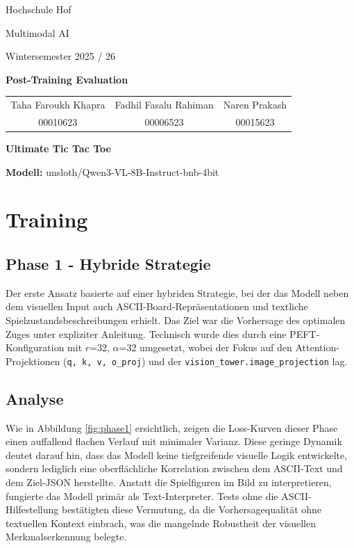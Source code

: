 \documentclass[12pt,a4paper]{article}
\begin{document}
	\begin{titlepage}
		\centering
		
		{\large Hochschule Hof}
		\vspace{0.5cm}
		
		{\large Multimodal AI}
		\vspace{0.5cm}
		
		{\large Wintersemester 2025 / 26}
		\vfill
		
		\vspace{0.5cm}
		{\huge\bfseries Post-Training Evaluation}
		\vspace{1cm}
		
		\begin{tabular}{c c c}
			\large Taha Faroukh Khapra & \large Fadhil Fasalu Rahiman & \large Naren Prakash \\
			\small 00010623 & \small 00006523 & \small 00015623
		\end{tabular}
		\vfill
		
		{\large \textbf{Ultimate Tic Tac Toe}}
		\vspace{0.5cm}
		
		{\large \textbf{Modell:} unsloth/Qwen3-VL-8B-Instruct-bnb-4bit}
		\vspace{0.5cm}
		
	\end{titlepage}
	
	\newpage
	
	\section{Training}
	
	\subsection{Phase 1 - Hybride Strategie} 
	Der erste Ansatz basierte auf einer hybriden Strategie, bei der das Modell neben dem visuellen Input auch ASCII-Board-Repräsentationen und textliche Spielzustandsbeschreibungen erhielt. Das Ziel war die Vorhersage des optimalen Zuges unter expliziter Anleitung. Technisch wurde dies durch eine PEFT-Konfiguration mit $r$=32, $\alpha$=32 umgesetzt, wobei der Fokus auf den Attention-Projektionen (\texttt{q, k, v, o\_proj}) und der \texttt{vision\_tower.image\_projection} lag. 

	\subsection{Analyse}
	Wie in Abbildung \ref{fig:phase1} ersichtlich, zeigen die Loss-Kurven dieser Phase einen auffallend flachen Verlauf mit minimaler Varianz. Diese geringe Dynamik deutet darauf hin, dass das Modell keine tiefgreifende visuelle Logik entwickelte, sondern lediglich eine oberflächliche Korrelation zwischen dem ASCII-Text und dem Ziel-JSON herstellte. Anstatt die Spielfiguren im Bild zu interpretieren, fungierte das Modell primär als Text-Interpreter. Tests ohne die ASCII-Hilfestellung bestätigten diese Vermutung, da die Vorhersagequalität ohne textuellen Kontext einbrach, was die mangelnde Robustheit der visuellen Merkmalserkennung belegte.
		
\end{document}
